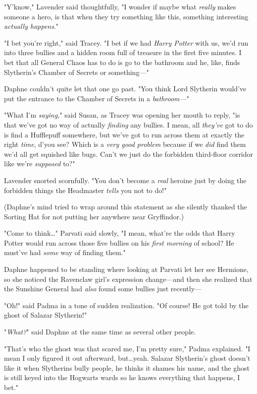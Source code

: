 "Y'know," Lavender said thoughtfully, "I wonder if maybe what \emph{really}
makes someone a hero, is that when they try something like this, something
interesting \emph{actually happens}."

"I bet you're right," said Tracey. "I bet if we had \emph{Harry Potter} with
us, we'd run into three bullies and a hidden room full of treasure in the first
five minutes. I bet that all General Chaos has to do is go to the bathroom and
he, like, finds Slytherin's Chamber of Secrets or something—"

Daphne couldn't quite let that one go past. "You think Lord Slytherin would've
put the entrance to the Chamber of Secrets in a \emph{bathroom—}"

"What I'm \emph{saying,}" said Susan, as Tracey was opening her mouth to reply,
"is that we've got no way of actually \emph{finding} any bullies. I mean, all
\emph{they've} got to do is find a Hufflepuff somewhere, but we've got to run
across them at exactly the right \emph{time}, d'you see? Which is a \emph{very
good problem} because if we \emph{did} find them we'd all get squished like
bugs. Can't we just do the forbidden third-floor corridor like we're
\emph{supposed} to?"

Lavender snorted scornfully. "You don't become a \emph{real} heroine just by
doing the forbidden things the Headmaster \emph{tells} you not to do!"

(Daphne's mind tried to wrap around this statement as she silently thanked the
Sorting Hat for not putting her anywhere near Gryffindor.)

"Come to think…" Parvati said slowly, "I mean, what're the odds that
Harry Potter would run across those five bullies on his \emph{first morning} of
school? He must've had \emph{some} way of finding them."

Daphne happened to be standing where looking at Parvati let her see Hermione,
so she noticed the Ravenclaw girl's expression change—and then she realized
that the Sunshine General had \emph{also} found some bullies just recently—

"Oh!" said Padma in a tone of sudden realization. "Of course! He got told by
the ghost of Salazar Slytherin!"

"\emph{What?}" said Daphne at the same time as several other people.

"That's who the ghost was that scared me, I'm pretty sure," Padma explained. "I
mean I only figured it out afterward, but…yeah. Salazar Slytherin's
ghost doesn't like it when Slytherins bully people, he thinks it shames his
name, and the ghost is still keyed into the Hogwarts wards so he knows
everything that happens, I bet."


